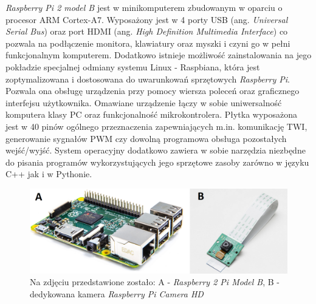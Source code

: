 \textit{Raspberry Pi 2 model B} jest w minikomputerem zbudowanym w oparciu o procesor ARM Cortex-A7. Wyposażony jest w 4 porty USB (ang. \textit{Universal Serial Bus}) oraz port HDMI (ang. \textit{High Definition Multimedia Interface}) co pozwala na podłączenie monitora, klawiatury oraz myszki i czyni go w pełni funkcjonalnym komputerem. Dodatkowo istnieje możliwość zainstalowania na jego pokładzie specjalnej odmiany systemu Linux - Raspbiana, która jest zoptymalizowana i dostosowana do uwarunkowań sprzętowych \textit{Raspberry Pi}. Pozwala ona obsługę urządzenia przy pomocy wiersza poleceń oraz graficznego interfejsu użytkownika. Omawiane urządzenie łączy w sobie uniwersalność komputera klasy PC oraz funkcjonalność mikrokontrolera. Płytka wyposażona jest w 40 pinów ogólnego przeznaczenia zapewniających m.in. komunikację TWI, generowanie sygnałów PWM czy dowolną programowa obsługa pozostałych wejść/wyjść. System operacyjny dodatkowo zawiera w sobie narzędzia niezbędne do pisania programów wykorzystujących jego sprzętowe zasoby zarówno w języku C++ jak i w Pythonie. 

\begin{figure}[H]
    \begin{center}
      \includegraphics[scale=0.3]{imgs/raspberry_pi.png}
 	\caption[Raspberry Pi wraz z kamerą.]{\small{Na zdjęciu przedstawione zostało: A - \textit{Raspberry 2 Pi Model B}}\footnotemark \small{, B - dedykowana kamera \textit{Raspberry Pi Camera HD}}\footnotemark }
	\label{trans_TWI}
    \end{center}
  \end{figure}  

